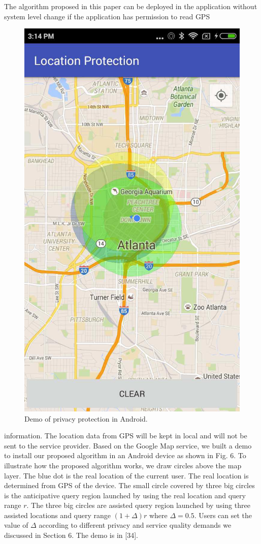 \documentclass[a4paper,fleqn]{cas-dc}
\begin{document}
The algorithm proposed in this paper can be deployed in the application without system level change if the application has permission to read GPS
\begin{figure}
    \centering
    \includegraphics[scale=.9]{figs/figs-6-1.png}
    \caption{Demo of privacy protection in Android.}
    \label{fig:my_label}
\end{figure}
information. The location data from GPS will be kept in local and will not be sent to the service provider. Based on the Google Map service, we built a demo to install our proposed algorithm in an Android device as shown in Fig. 6. To illustrate how the proposed algorithm works, we draw circles above the map layer. The blue dot is the real location of the current user. The real location is determined from GPS of the device. The small circle covered by three big circles is the anticipative query region launched by using the real location and query range $r$. The three big circles are assisted query region launched by using three assisted locations and query range $(1+\Delta) r$ where $\Delta=0.5$. Users can set the value of $\Delta$ according to different privacy and service quality demands we discussed in Section 6. The demo is in [34].
\end{document}
